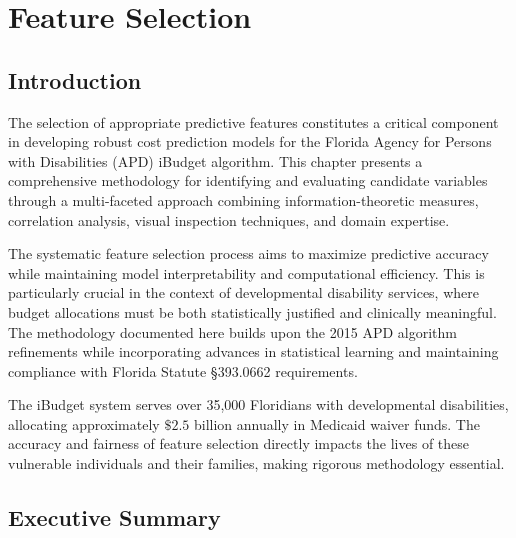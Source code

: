 


\providecommand{\FSExampleYear}{2025}

\graphicspath{{figures/}{./figures/}}

\chapter{Feature Selection}
\label{ch:feature-selection}

\section{Introduction}

The selection of appropriate predictive features constitutes a critical component in developing robust cost prediction models for the Florida Agency for Persons with Disabilities (APD) iBudget algorithm. This chapter presents a comprehensive methodology for identifying and evaluating candidate variables through a multi-faceted approach combining information-theoretic measures, correlation analysis, visual inspection techniques, and domain expertise. 

The systematic feature selection process aims to maximize predictive accuracy while maintaining model interpretability and computational efficiency. This is particularly crucial in the context of developmental disability services, where budget allocations must be both statistically justified and clinically meaningful. The methodology documented here builds upon the 2015 APD algorithm refinements while incorporating advances in statistical learning and maintaining compliance with Florida Statute §393.0662 requirements.

The iBudget system serves over 35,000 Floridians with developmental disabilities, allocating approximately $\$2.5$ billion annually in Medicaid waiver funds. The accuracy and fairness of feature selection directly impacts the lives of these vulnerable individuals and their families, making rigorous methodology essential.

\section{Executive Summary}

